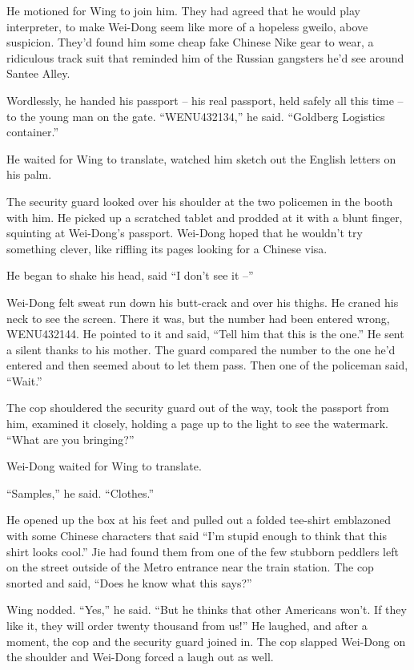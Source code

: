 He motioned for Wing to join him. They had agreed that he would
play interpreter, to make Wei-Dong seem like more of a hopeless
gweilo, above suspicion. They'd found him some cheap fake Chinese
Nike gear to wear, a ridiculous track suit that reminded him of the
Russian gangsters he'd see around Santee Alley.

Wordlessly, he handed his passport -- his real passport, held
safely all this time -- to the young man on the gate. ``WENU432134,''
he said. ``Goldberg Logistics container.''

He waited for Wing to translate, watched him sketch out the English
letters on his palm.

The security guard looked over his shoulder at the two policemen in
the booth with him. He picked up a scratched tablet and prodded at
it with a blunt finger, squinting at Wei-Dong's passport. Wei-Dong
hoped that he wouldn't try something clever, like riffling its
pages looking for a Chinese visa.

He began to shake his head, said ``I don't see it --''

Wei-Dong felt sweat run down his butt-crack and over his thighs. He
craned his neck to see the screen. There it was, but the number had
been entered wrong, WENU432144. He pointed to it and said, ``Tell
him that this is the one.'' He sent a silent thanks to his mother.
The guard compared the number to the one he'd entered and then
seemed about to let them pass. Then one of the policeman said,
``Wait.''

The cop shouldered the security guard out of the way, took the
passport from him, examined it closely, holding a page up to the
light to see the watermark. ``What are you bringing?''

Wei-Dong waited for Wing to translate.

``Samples,'' he said. ``Clothes.''

He opened up the box at his feet and pulled out a folded tee-shirt
emblazoned with some Chinese characters that said ``I'm stupid
enough to think that this shirt looks cool.'' Jie had found them
from one of the few stubborn peddlers left on the street outside of
the Metro entrance near the train station. The cop snorted and
said, ``Does he know what this says?''

Wing nodded. ``Yes,'' he said. ``But he thinks that other Americans
won't. If they like it, they will order twenty thousand from us!''
He laughed, and after a moment, the cop and the security guard
joined in. The cop slapped Wei-Dong on the shoulder and Wei-Dong
forced a laugh out as well.

